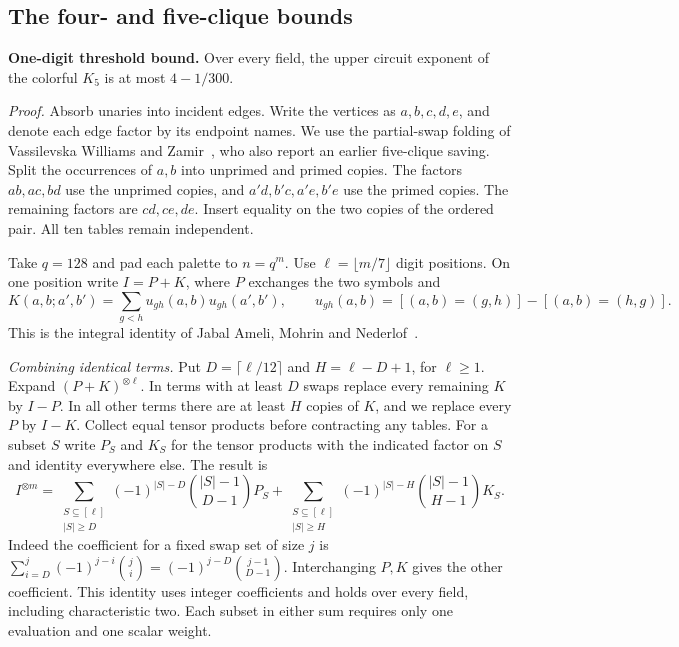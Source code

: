 \documentclass[11pt,letterpaper]{article}
\begin{document}
\subsection{The four- and five-clique bounds}\label{five-clique-saving}

\textbf{One-digit threshold bound.} Over every field, the upper circuit exponent of the colorful
\(K_5\) is at most \(4-1/300\).

\emph{Proof.} Absorb unaries into incident edges. Write the vertices as
\(a,b,c,d,e\), and denote each edge factor by its endpoint names.
We use the partial-swap folding of Vassilevska Williams and Zamir~\cite[Lemma~3.2 and Section~6]{vw-zamir}, who also report an earlier five-clique saving. Split the occurrences of \(a,b\) into unprimed and primed copies. The factors
\(ab,ac,bd\) use the unprimed copies, and \(a'd,b'c,a'e,b'e\) use the primed
copies. The remaining factors are \(cd,ce,de\). Insert equality on the two
copies of the ordered pair. All ten tables remain independent.

Take \(q=128\) and pad each palette to \(n=q^m\). Use
\(\ell=\lfloor m/7\rfloor\) digit positions. On one position write
\(I=P+K\), where \(P\) exchanges the two symbols and
\[
 K(a,b;a',b')=\sum_{g<h} u_{gh}(a,b)u_{gh}(a',b'),\qquad
 u_{gh}(a,b)=[(a,b)=(g,h)]-[(a,b)=(h,g)] .
\]
This is the integral identity of Jabal Ameli, Mohrin and
Nederlof~\cite[Lemma~3]{amn-six}.

\emph{Combining identical terms.}
Put \(D=\lceil\ell/12\rceil\) and \(H=\ell-D+1\), for \(\ell\ge1\).
Expand \((P+K)^{\otimes\ell}\). In terms with at least \(D\) swaps
replace every remaining \(K\) by \(I-P\). In all other terms there
are at least \(H\) copies of \(K\), and we replace every \(P\) by \(I-K\).
Collect equal tensor products before contracting any tables.
For a subset \(S\) write \(P_S\) and \(K_S\) for the tensor products
with the indicated factor on \(S\) and identity everywhere else. The result is
\[
 I^{\otimes m}=
 \sum_{\substack{S\subseteq[\ell]\\|S|\ge D}}
   (-1)^{|S|-D}\binom{|S|-1}{D-1}P_S+
 \sum_{\substack{S\subseteq[\ell]\\|S|\ge H}}
   (-1)^{|S|-H}\binom{|S|-1}{H-1}K_S .
\]
Indeed the coefficient for a fixed swap set of size \(j\) is
\(\sum_{i=D}^j(-1)^{j-i}\binom ji=(-1)^{j-D}\binom{j-1}{D-1}\).
Interchanging \(P,K\) gives the other coefficient. This identity uses
integer coefficients and holds over every field, including characteristic two.
Each subset in either sum requires only one evaluation and one scalar weight.
\end{document}
